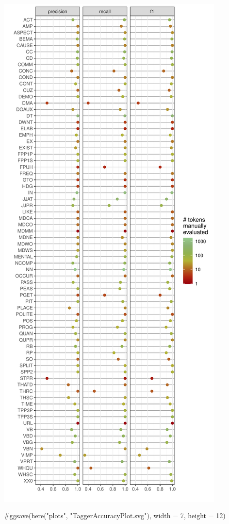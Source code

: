 \documentclass[
  letterpaper,
  DIV=11,
  numbers=noendperiod]{scrreprt}
\newenvironment{Shaded}{\begin{snugshade}}{\end{snugshade}}
\newcommand{\CommentTok}[1]{\textcolor[rgb]{0.37,0.37,0.37}{#1}}
\begin{document}
\includegraphics{AppendixD_files/figure-pdf/unnamed-chunk-10-1.pdf}

\begin{Shaded}
\begin{Highlighting}[]
\CommentTok{\#ggsave(here("plots", "TaggerAccuracyPlot.svg"), width = 7, height = 12)}
\end{Highlighting}
\end{Shaded}
\end{document}
